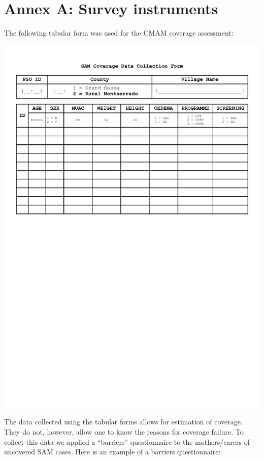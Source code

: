 \documentclass[12pt,a4paper]{article}
\begin{document}
\hypertarget{annex-a-survey-instruments}{%
\section*{Annex A: Survey instruments}\label{annex-a-survey-instruments}}

The following tabular form was used for the CMAM coverage assessment:

\begin{center}\includegraphics[width=0.9\linewidth]{forms/samForm} \end{center}

The data collected using the tabular forms allows for estimation of coverage. They do not, however, allow one to know the reasons for coverage failure. To collect this data we applied a ``barriers'' questionnaire to the mothers/carers of uncovered SAM cases. Here is an example of a barriers questionnaire:

\newpage
\end{document}
